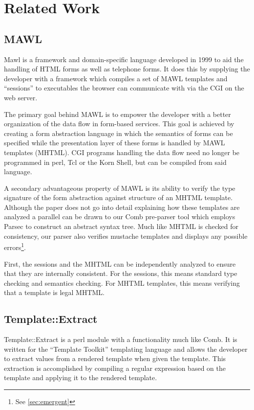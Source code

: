 \documentclass[thesis.tex]{subfiles}
\begin{document}


\chapter{Related Work}
\section{MAWL}
Mawl\cite{MAWL} is a framework and domain-specific language developed in 1999
to aid the handling of HTML forms as well as telephone forms.
It does this by supplying the developer with a framework which compiles
a set of MAWL templates and ``sessions'' to executables
the browser can communicate with via the CGI on the web server.

The primary goal behind MAWL is to empower the developer with a better
organization of the data flow in form-based services.
This goal is achieved by creating a form abstraction language in which the
semantics of forms can be specified while the presentation layer of these forms
is handled by MAWL templates (MHTML).
CGI programs handling the data flow need no longer be programmed in
perl, Tcl or the Korn Shell, but can be compiled from said language.

A secondary advantageous property of MAWL is its ability to verify the
type signature of the form abstraction against structure of an MHTML template.
Although the paper does not go into detail explaining how these templates are
analyzed a parallel can be drawn to our Comb pre-parser tool which employs
Parsec to construct an abstract syntax tree. Much like MHTML is checked for
consistency, our parser also verifies mustache templates and displays any
possible errors\footnote{See \ref{sec:emergent}}.
\begin{citequote}{\cite{MAWL}}
First, the sessions and the MHTML can be independently analyzed to ensure that
they are internally consistent.
For the sessions, this means standard type checking and semantics checking.
For MHTML templates, this means verifying that a template is legal MHTML.
\end{citequote}


\section{Template::Extract}
Template::Extract\cite{TPLEXTRACT} is a perl module with a functionality much
like Comb. It is written for the ``Template Toolkit'' templating language and
allows the developer to extract values from a rendered template when given the
template. This extraction is accomplished by compiling a regular expression
based on the template and applying it to the rendered template.
\end{document}
